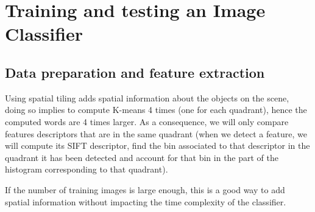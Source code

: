 \documentclass{article}
\begin{document}
\maketitle





\newpage

\section{Training and testing an Image Classifier}

\subsection{Data preparation and feature extraction}


Using spatial tiling adds spatial information about the objects on the
scene, doing so implies to compute K-means 4 times (one for each quadrant),
hence the computed words are 4 times larger.
As a consequence, we will only compare features descriptors that
are in the same quadrant (when we detect a feature, we will compute
its SIFT descriptor, find the bin associated to that descriptor
in the quadrant it has been detected and account for that bin in
the part of the histogram corresponding to that quadrant).

If the number of training images is large enough, this is a good way
to add spatial information without impacting the time complexity
of the classifier.
\end{document}
